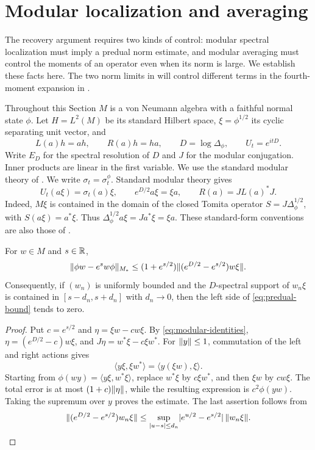 \section{Modular localization and averaging}\label{sec:modular}

The recovery argument requires two kinds of control: modular spectral
localization must imply a predual norm estimate, and modular averaging
must control the moments of an operator even when its norm is large.
We establish these facts here. The two norm limits in
 will control different terms in the fourth-moment
expansion in .

Throughout this Section $M$ is a von Neumann algebra with a faithful
normal state $\phi$. Let $H=L^2(M)$ be its standard Hilbert space,
$\xi=\phi^{1/2}$ its cyclic separating unit vector, and
\[
  L(a)h=ah,\qquad R(a)h=ha,\qquad
  D=\log\Delta_\phi,\qquad U_t=e^{itD}.
\]
Write $E_D$ for the spectral resolution of $D$ and $J$ for the modular
conjugation. Inner products are linear in the first variable.
We use the standard modular theory of \cite{Takesaki2003}.
We write $\sigma_t=\sigma^\phi_t$.
Standard modular theory gives
\begin{equation}\label{eq:modular-identities}
  U_t(a\xi)=\sigma_t(a)\xi,\qquad
  e^{D/2}a\xi=\xi a,\qquad
  R(a)=JL(a)^*J.
\end{equation}
Indeed, $M\xi$ is contained in the domain of the closed Tomita operator
$S=J\Delta_\phi^{1/2}$, with $S(a\xi)=a^*\xi$.
Thus $\Delta_\phi^{1/2}a\xi=Ja^*\xi=\xi a$.
These standard-form conventions are also those of
\cite[Section~2.1]{AHHM2020}.

\begin{lemma}\label{mod:predual}
For $w\in M$ and $s\in\mathbb R$,
\begin{equation}\label{eq:predual-bound}
  \lVert\phi w-e^sw\phi\rVert_{M_*}
  \le (1+e^{s/2})\lVert(e^{D/2}-e^{s/2})w\xi\rVert.
\end{equation}
Consequently, if $(w_n)$ is uniformly bounded and the $D$-spectral
support of $w_n\xi$ is contained in
$[s-d_n,s+d_n]$ with $d_n\to0$, then the left side of
\eqref{eq:predual-bound} tends to zero.
\end{lemma}

\begin{proof}
Put $c=e^{s/2}$ and $\eta=\xi w-cw\xi$.
By \eqref{eq:modular-identities},
$\eta=(e^{D/2}-c)w\xi$, and
$J\eta=w^*\xi-c\xi w^*$.
For $\lVert y\rVert\le1$, commutation of the left and right actions gives
\[
  \langle y\xi,\xi w^*\rangle
  =\langle y(\xi w),\xi\rangle.
\]
Starting from $\phi(wy)=\langle y\xi,w^*\xi\rangle$, replace
$w^*\xi$ by $c\xi w^*$, and then $\xi w$ by $cw\xi$.
The total error is at most $(1+c)\lVert\eta\rVert$, while the resulting
expression is $c^2\phi(yw)$. Taking the supremum over $y$ proves the
estimate. The last assertion follows from
\[
  \lVert(e^{D/2}-e^{s/2})w_n\xi\rVert
  \le \sup_{\lvert u-s\rvert\le d_n}\lvert e^{u/2}-e^{s/2}\rvert\,
       \lVert w_n\xi\rVert.
  \qedhere
\]
\end{proof}

